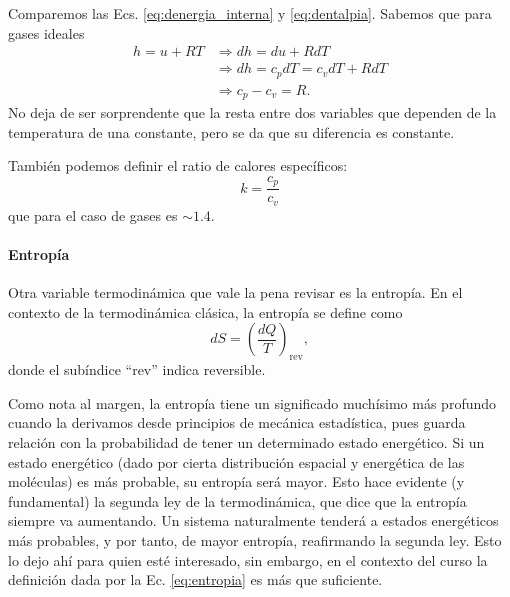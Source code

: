 Comparemos las Ecs. \eqref{eq:denergia_interna} y \eqref{eq:dentalpia}.
Sabemos que para gases ideales
%
\begin{align}
h = u + RT &\Rightarrow dh = du + RdT\nonumber\\
&\Rightarrow dh = c_pdT = c_vdT + RdT\nonumber\\
&\Rightarrow c_p-c_v=R.
\end{align}
%
No deja de ser sorprendente que la resta entre dos variables que dependen de la temperatura de una constante, pero se da que su diferencia es constante.

También podemos definir el ratio de calores específicos:
%
\begin{equation}
k = \frac{c_p}{c_v}
\end{equation}
%
que para el caso de gases es $\sim1.4$.

\paragraph*{Entropía}
Otra variable termodinámica que vale la pena revisar es la entropía.
En el contexto de la termodinámica clásica, la entropía se define como
%
\begin{equation}\label{eq:entropia}
dS = \left(\frac{dQ}{T}\right)_\text{rev},
\end{equation}
%
donde el subíndice ``rev'' indica reversible. 

Como nota al margen, la entropía tiene un significado muchísimo más profundo cuando la derivamos desde principios de mecánica estadística, pues guarda relación con la probabilidad de tener un determinado estado energético.
Si un estado energético (dado por cierta distribución espacial y energética de las moléculas) es más probable, su entropía será mayor.
Esto hace evidente (y fundamental) la segunda ley de la termodinámica, que dice que la entropía siempre va aumentando.
Un sistema naturalmente tenderá a estados energéticos más probables, y por tanto, de mayor entropía, reafirmando la segunda ley.
Esto lo dejo ahí para quien esté interesado, sin embargo, en el contexto del curso la definición dada por la Ec. \eqref{eq:entropia} es más que suficiente.


